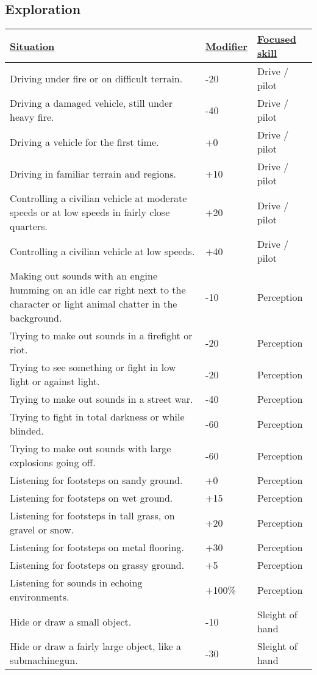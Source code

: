 \subsection{Exploration}
\begin{tabularx}{\textwidth}{|X|l|l|}
	\hline
	\ul{Situation} & \ul{Modifier} & \ul{Focused skill} \\ \hline
	Driving under fire or on difficult terrain. & -20 & Drive / pilot \\ \hline
	Driving a damaged vehicle, still under heavy fire. & -40 & Drive / pilot \\ \hline
	Driving a vehicle for the first time. & +0 & Drive / pilot \\ \hline
	Driving in familiar terrain and regions. & +10 & Drive / pilot \\ \hline
	Controlling a civilian vehicle at moderate speeds or at low speeds in fairly close quarters. & +20 & Drive / pilot \\ \hline
	Controlling a civilian vehicle at low speeds. & +40 & Drive / pilot \\ \hline
	Making out sounds with an engine humming on an idle car right next to the character or light animal chatter in the background. & -10 & Perception \\ \hline
	Trying to make out sounds in a firefight or riot. & -20 & Perception \\ \hline
	Trying to see something or fight in low light or against light. & -20 & Perception \\ \hline
	Trying to make out sounds in a street war. & -40 & Perception \\ \hline
	Trying to fight in total darkness or while blinded. & -60 & Perception \\ \hline
	Trying to make out sounds with large explosions going off. & -60 & Perception \\ \hline
	Listening for footsteps on sandy ground. & +0 & Perception \\ \hline
	Listening for footsteps on wet ground. & +15 & Perception \\ \hline
	Listening for footsteps in tall grass, on gravel or snow. & +20 & Perception \\ \hline
	Listening for footsteps on metal flooring. & +30 & Perception \\ \hline
	Listening for footsteps on grassy ground. & +5 & Perception \\ \hline
	Listening for sounds in echoing environments. & +100\% & Perception \\ \hline
	Hide or draw a small object. & -10 & Sleight of hand \\ \hline
	Hide or draw a fairly large object, like a submachinegun. & -30 & Sleight of hand \\ \hline
\end{tabularx}

